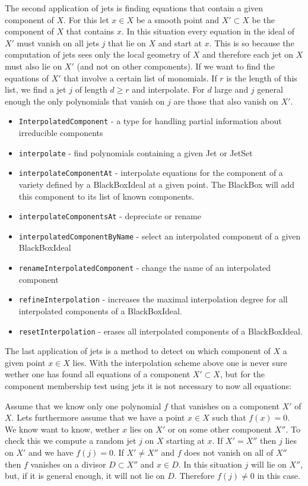 \documentclass[12pt,a4paper]{amsart}
\theoremstyle{plain}
\theoremstyle{definition}
\begin{document}
The second application of jets is finding equations that contain a given component of $X$. For this let $x \in X$ be a smooth point and $X' \subset X$ be the component of $X$ that contains $x$. In this situation every equation in the ideal of $X'$ must vanish on all jets $j$ that lie on $X$ and start at $x$. This is so because the computation of jets sees only the local geometry of $X$ and therefore each jet on $X$ must also lie on $X'$ (and not on other components). If we want to find the equations of $X'$ that involve a certain list of monomials. If $r$ is the length of this list, we find a jet $j$ of length $d \ge r$ and interpolate. For $d$ large and $j$ general enough the only polynomials that vanish on $j$ are those that also vanish on $X'$.

\begin{itemize}
\item {\tt InterpolatedComponent} - a type for handling partial information about irreducible components
\item {\tt interpolate} - find polynomials containing a given Jet or JetSet
\item {\tt interpolateComponentAt} - interpolate equations for the component of a variety defined by a BlackBoxIdeal at a given point. The BlackBox will add this component to its list of known components.
\item {\tt interpolateComponentsAt}  - {\color{red} depreciate or rename}
\item {\tt interpolatedComponentByName} - select an interpolated component of a given BlackBoxIdeal
\item {\tt renameInterpolatedComponent} - change the name of an interpolated component
\item {\tt refineInterpolation} - increases the maximal interpolation degree for all interpolated components of a BlackBoxIdeal.
\item {\tt resetInterpolation} - erases all interpolated components of a BlackBoxIdeal.
\end{itemize}


The last application of jets is a method to detect on which component of $X$ a given point $x \in X$ lies. 
With the interpolation scheme above one is never sure wether one has found all equations of a component $X' \subset X$, but for the component membership test using jets it is not necessary to now all equations:

Assume that we know only one polynomial $f$ that vanishes on a component $X'$ of $X$. Lets furthermore assume that we have a point $x \in X$ such that $f(x) = 0$. We know want to know, wether $x$ lies on $X'$ or on some other component $X''$. To check this we compute a random jet $j$ on $X$ starting at $x$. If $X' = X''$ then $j$ lies on $X'$ and we have $f(j) = 0$. If $X' \not= X''$ and $f$ does not vanish on all of $X''$ then $f$ vanishes on a divisor $D \subset X''$ and $x \in D$.  In this situation $j$ will lie on $X''$, but, if it is general enough, it will not lie on $D$. Therefore $f(j) \not=0$ in this case. 
\end{document}
